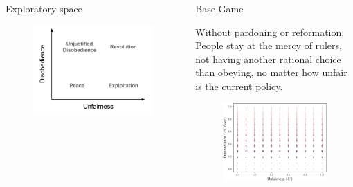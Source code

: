 \documentclass[xcolor={table}]{beamer}
\begin{document}
\begin{frame}[fragile=singleslide,t]
\begin{columns}[T]
\begin{column}{.42\textwidth}
\begin{block}{Exploratory space}
\begin{figure}
  \centering
  \includegraphics[width=0.8\linewidth]{img/space_disob.pdf} 
\end{figure}
\end{block} 

\end{column}
\begin{column}{.58\textwidth}


\begin{block}{Base Game}

Without pardoning or reformation, People stay at the mercy of rulers, not having another rational choice than obeying, no matter how unfair is the current policy.


\begin{figure}
  \centering
  \includegraphics[width=0.55\linewidth]{img/phasebase-crop.pdf} 
\end{figure}



\end{block}
\end{column}
\end{columns}
\end{frame}
\end{document}
